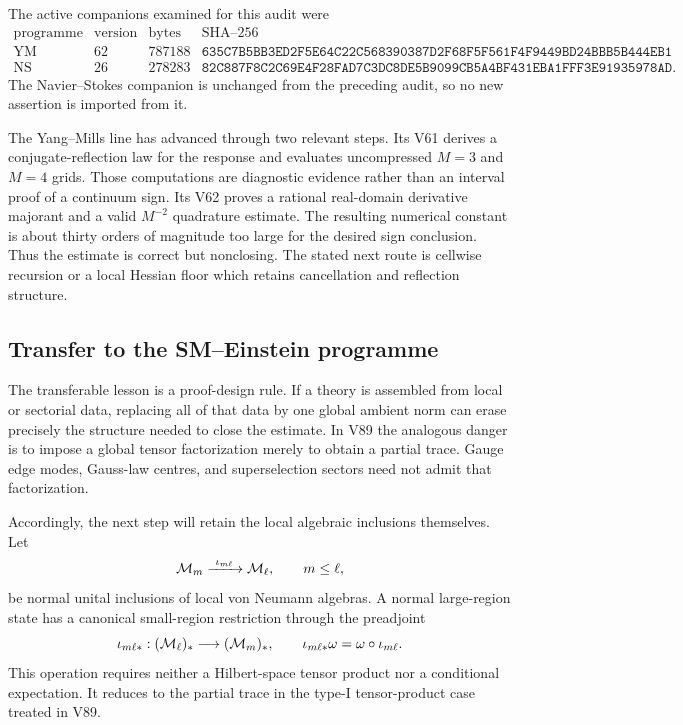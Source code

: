 \documentclass[11pt]{article}
\theoremstyle{remark}
\begin{document}
The active companions examined for this audit were
\[
\begin{array}{c|c|c|c}
\text{programme}&\text{version}&\text{bytes}&\text{SHA--256}\\ \hline
\mathrm{YM}&62&787188&
\texttt{635C7B5BB3ED2F5E64C22C568390387D2F68F5F561F4F9449BD24BBB5B444EB1}\\
\mathrm{NS}&26&278283&
\texttt{82C887F8C2C69E4F28FAD7C3DC8DE5B9099CB5A4BF431EBA1FFF3E91935978AD}.
\end{array}
\]
The Navier--Stokes companion is unchanged from the preceding audit,
so no new assertion is imported from it.

The Yang--Mills line has advanced through two relevant steps.  Its
V61 derives a conjugate-reflection law for the response and evaluates
uncompressed \(M=3\) and \(M=4\) grids.  Those computations are
diagnostic evidence rather than an interval proof of a continuum
sign.  Its V62 proves a rational real-domain derivative majorant and
a valid \(M^{-2}\) quadrature estimate.  The resulting numerical
constant is about thirty orders of magnitude too large for the
desired sign conclusion.  Thus the estimate is correct but
nonclosing.  The stated next route is cellwise recursion or a local
Hessian floor which retains cancellation and reflection structure.

\subsection{Transfer to the SM--Einstein programme}

The transferable lesson is a proof-design rule.  If a theory is
assembled from local or sectorial data, replacing all of that data by
one global ambient norm can erase precisely the structure needed to
close the estimate.  In V89 the analogous danger is to impose a
global tensor factorization merely to obtain a partial trace.  Gauge
edge modes, Gauss-law centres, and superselection sectors need not
admit that factorization.

Accordingly, the next step will retain the local algebraic
inclusions themselves.  Let
\[
 {\cal M}_m\xrightarrow{\ \iota_{m\ell}\ }{\cal M}_\ell,
 \qquad m\leq\ell,
\]
be normal unital inclusions of local von Neumann algebras.  A normal
large-region state has a canonical small-region restriction through
the preadjoint
\[
 \iota_{m\ell *}:({\cal M}_\ell)_*\longrightarrow({\cal M}_m)_*,
 \qquad
 \iota_{m\ell *}\omega=\omega\circ\iota_{m\ell}.
\]
This operation requires neither a Hilbert-space tensor product nor a
conditional expectation.  It reduces to the partial trace in the
type-I tensor-product case treated in V89.
\end{document}
